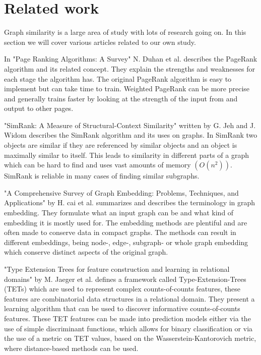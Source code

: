 \section{Related work}
\label{sec:Related_work}
Graph similarity is a large area of study with lots of research going on. In this section we will cover various articles related to our own study.

In "Page Ranking Algorithms: A Survey" N. Duhan et al.\cite{4809246} describes the PageRank algorithm and its related concept. They explain the strengths and weaknesses for each stage the algorithm has. The original PageRank algorithm is easy to implement but can take time to train. Weighted PageRank can be more precise and generally trains faster by looking at the strength of the input from and output to other pages. 

"SimRank: A Measure of Structural-Context Similarity" written by G. Jeh and J. Widom\cite{10.1145/775047.775126} describes the SimRank algorithm and its uses on graphs. In SimRank two objects are similar if they are referenced by similar objects and an object is maximally similar to itself. This leads to similarity in different parts of a graph which can be hard to find and uses vast amounts of memory $(O(n^2))$. SimRank is reliable in many cases of finding similar subgraphs. 

"A Comprehensive Survey of Graph Embedding: Problems, Techniques, and Applications" by H. cai et al.\cite{8294302} summarizes and describes the terminology in graph embedding. They formulate what an input graph can be and what kind of embedding it is mostly used for. The embedding methods are plentiful and are often made to conserve data in compact graphs. The methods can result in different embeddings, being node-, edge-, subgraph- or whole graph embedding which conserve distinct aspects of the original graph.

"Type Extension Trees for feature construction and learning in relational domains" by M. Jaeger et al. \cite{JAEGER201330} defines a framework called Type-Extension-Trees (TETs) which are used to represent complex counts-of-counts features, these features are combinatorial data structures in a relational domain. They present a learning algorithm that can be used to discover informative counts-of-counts features. These TET features can be made into prediction models either via the use of simple discriminant functions, which allows for binary classification or via the use of a metric on TET values, based on the Wasserstein-Kantorovich metric, where distance-based methods can be used.

